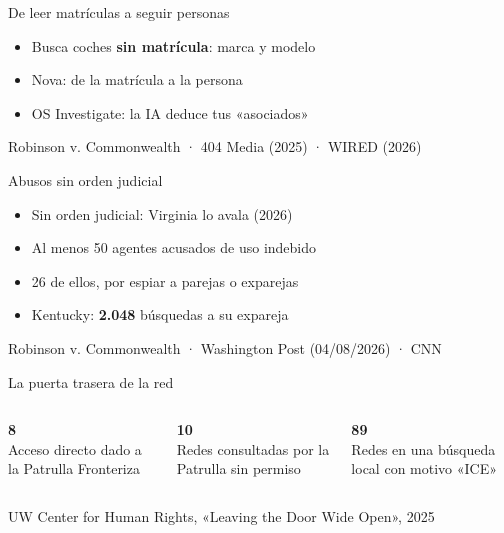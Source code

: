 \documentclass[aspectratio=169,12pt]{beamer}
\def\navprev{}
\def\navnext{}
\newcommand{\nav}[2]{\gdef\navprev{#1}\gdef\navnext{#2}}
\newcommand{\fuente}[1]{\vfill{\small\color{gris}#1\par}}
\begin{document}
\nav{Flock Safety}{Abusos}
\begin{frame}{De leer matrículas a seguir personas}
  \begin{itemize}
    \item Busca coches \alert{\textbf{sin matrícula}}: marca y modelo
    \item Nova: de la matrícula a la persona
    \item OS Investigate: la IA deduce tus «asociados»
  \end{itemize}
  \fuente{Robinson v. Commonwealth · 404 Media (2025) · WIRED (2026)}
\end{frame}

\nav{Seguir personas}{Puerta trasera}
\begin{frame}{Abusos sin orden judicial}
  \begin{itemize}
    \item Sin orden judicial: Virginia lo avala (2026)
    \item Al menos 50 agentes acusados de uso indebido
    \item 26 de ellos, por espiar a parejas o exparejas
    \item Kentucky: \alert{\textbf{2.048}} búsquedas a su expareja
  \end{itemize}
  \fuente{Robinson v. Commonwealth · Washington Post (04/08/2026) · CNN}
\end{frame}

\nav{Abusos}{Presión ciudadana}
\begin{frame}{La puerta trasera de la red}
  \begin{columns}[T]
      \begin{center}
        {\color{azul}\fontsize{44}{48}\selectfont\bfseries 8}\\[0.2cm]
        {\large Acceso directo dado a la Patrulla Fronteriza}
      \end{center}
      \begin{center}
        {\color{terra}\fontsize{44}{48}\selectfont\bfseries 10}\\[0.2cm]
        {\large Redes consultadas por la Patrulla sin permiso}
      \end{center}
      \begin{center}
        {\color{azul}\fontsize{44}{48}\selectfont\bfseries 89}\\[0.2cm]
        {\large Redes en una búsqueda local con motivo «ICE»}
      \end{center}
  \end{columns}
  \fuente{UW Center for Human Rights, «Leaving the Door Wide Open», 2025}
\end{frame}
\end{document}
